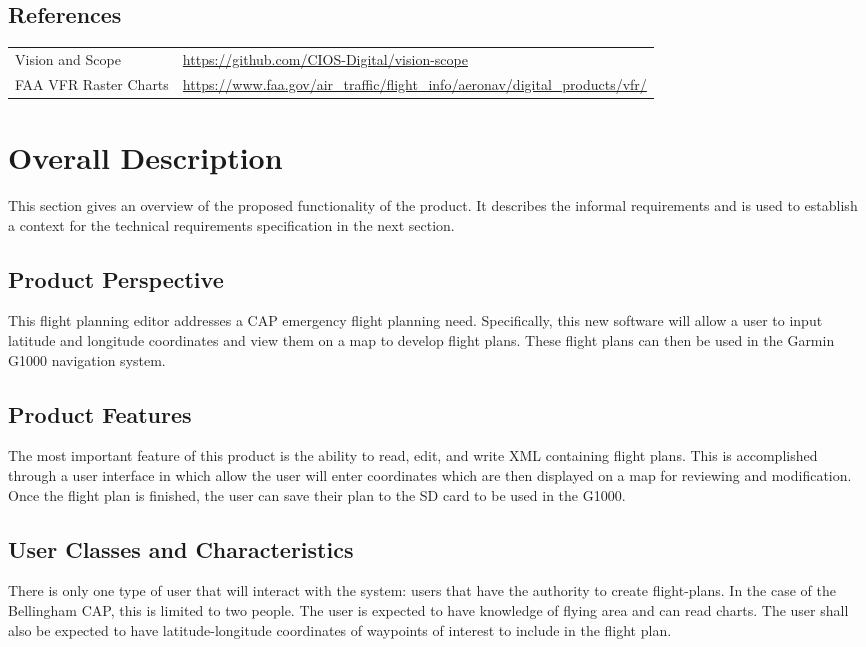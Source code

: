 \documentclass[12pt, letterpaper]{article}
\begin{document}
  \subsection{References}\label{sec:ref}
  \begin{tabularx}{\textwidth}{l|X}
    \hline
    Vision and Scope & \url{https://github.com/CIOS-Digital/vision-scope}\\
    FAA VFR Raster Charts & \url{https://www.faa.gov/air_traffic/flight_info/aeronav/digital_products/vfr/} \\
    \hline
  \end{tabularx}

  \newpage
\section{Overall Description}
  This section gives an overview of the proposed functionality of the product.
  It describes the informal requirements and is used to establish a context for the technical
  requirements specification in the next section.
  \subsection{Product Perspective}
    This flight planning editor addresses a CAP emergency flight planning need.
    Specifically, this new software will allow a user to input latitude and longitude coordinates
    and view them on a map to develop flight plans.
    These flight plans can then be used in the Garmin G1000 navigation system.
  \subsection{Product Features}
    The most important feature of this product is the ability to read, edit, and write XML containing flight plans.
    This is accomplished through a user interface in which allow the user will enter coordinates which are then
    displayed on a map for reviewing and modification.
    Once the flight plan is finished, the user can save their plan to the SD card to be used in the G1000.
  \subsection{User Classes and Characteristics}
    There is only one type of user that will interact with the system:
    users that have the authority to create flight-plans.
    In the case of the Bellingham CAP, this is limited to two people.
    The user is expected to have knowledge of flying area and can read charts.
    The user shall also be expected to have latitude-longitude coordinates of
    waypoints of interest to include in the flight plan.
\end{document}
